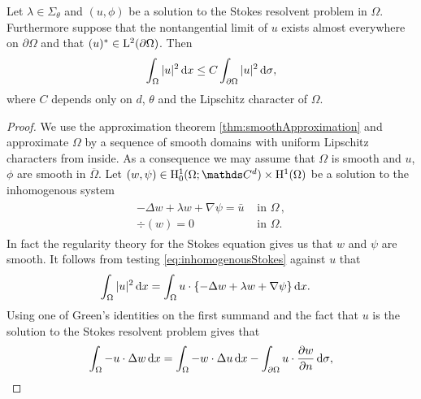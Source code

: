 \begin{lem}
  \label{lem:l2unique}
  Let $\lambda \in \Sigma_\theta$ and $(u,\phi)$ be a solution to the Stokes resolvent problem in $\Omega$.
  Furthermore suppose that the nontangential limit of $u$ exists almost everywhere on $\partial\Omega$ and that $(u)^* \in \mathrm{L}^2(\partial\Omega)$.
  Then 
  \begin{align}
    \label{eq:OmegaBoundaryEstimate}
    \int_\Omega |u|^2 \, {\operatorname{d}\!{x}} \leq C \int_{\partial\Omega} |u|^2 \, {\operatorname{d}\!{\sigma}},
  \end{align}
  where $C$ depends only on $d$, $\theta$ and the Lipschitz character of $\Omega$.
\end{lem}

\begin{proof}
  We use the approximation theorem \ref{thm:smoothApproximation} and approximate $\Omega$ by a sequence of smooth domains with uniform Lipschitz characters from inside.
  As a consequence we may assume that $\Omega$ is smooth and $u$, $\phi$ are smooth in $\overline\Omega$.
  Let $(w,\psi) \in \HH_0^1(\Omega; \C^d) \times \HH^1(\Omega)$ be a solution to the inhomogenous system
  \begin{align}
    \label{eq:inhomogenousStokes}
    \begin{alignedat}{1}
      - \Delta w + \lambda w + \nabla \psi = \bar u &\text{ in } \Omega\,, \\
      \div(w) = 0 &\text{ in } \Omega.
    \end{alignedat}
  \end{align}
  In fact the regularity theory for the Stokes equation gives us that $w$ and $\psi$ are smooth.
  It follows from testing \eqref{eq:inhomogenousStokes} against $u$ that
  \begin{align}
    \label{eq:testingInhomogenousStokes}
    \int_\Omega |u|^2 \, {\operatorname{d}\!{x}}
    &= \int_\Omega u \cdot \{ - \Delta w + \lambda w + \nabla \psi \} \, {\operatorname{d}\!{x}}.
  \end{align}
  Using one of Green's identities on the first summand and the fact that $u$ is the solution to the Stokes resolvent problem gives that
  \begin{align*}
    \int_\Omega -u \cdot \Delta w \d x
    &= \int_\Omega -w \cdot \Delta u \d x - \int_{\partial\Omega} u \cdot \frac{\partial w}{\partial n} \d \sigma, \\

\end{align*}
\end{proof}
